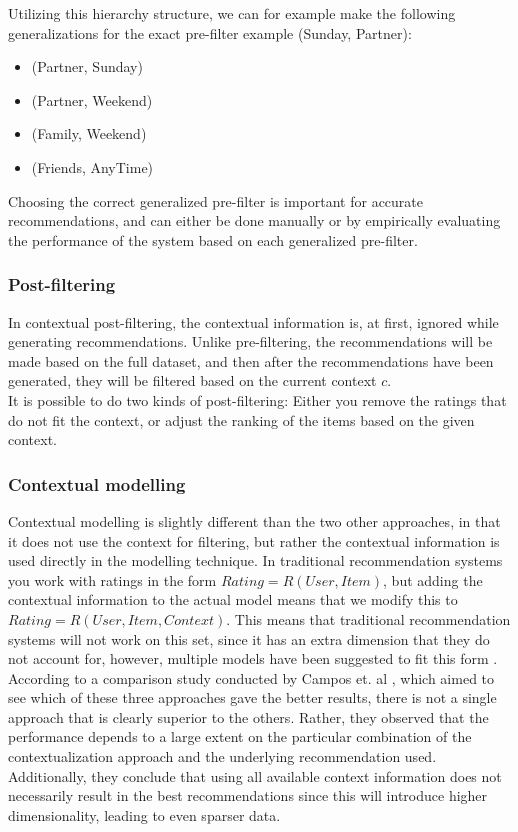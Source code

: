 Utilizing this hierarchy structure, we can for example make the following generalizations for the exact pre-filter example (Sunday, Partner):
\begin{itemize}
	\item (Partner, Sunday)
	\item (Partner, Weekend)
	\item (Family, Weekend)
	\item (Friends, AnyTime)
\end{itemize}

Choosing the correct generalized pre-filter is important for accurate recommendations, and can either be done manually or by empirically evaluating the performance of the system based on each generalized pre-filter.

\subsubsection*{Post-filtering}
In contextual post-filtering, the contextual information is, at first, ignored while generating recommendations.
Unlike pre-filtering, the recommendations will be made based on the full dataset, and then after the recommendations have been generated, they will be filtered based on the current context $c$.\\
It is possible to do two kinds of post-filtering: Either you remove the ratings that do not fit the context, or adjust the ranking of the items based on the given context.

\subsubsection*{Contextual modelling}
Contextual modelling is slightly different than the two other approaches, in that it does not use the context for filtering, but rather the contextual information is used directly in the modelling technique.
In traditional recommendation systems you work with ratings in the form $Rating = R(User, Item)$, but adding the contextual information to the actual model means that we modify this to $Rating = R(User, Item, Context)$.
This means that traditional recommendation systems will not work on this set, since it has an extra dimension that they do not account for, however, multiple models have been suggested to fit this form \cite{Adomavicius2011}.\\

According to a comparison study conducted by Campos et. al \cite{10.1007/978-3-642-39878-0_13}, which aimed to see which of these three approaches gave the better results, there is not a single approach that is clearly superior to the others.
Rather, they observed that the performance depends to a large extent on the particular combination of the contextualization approach and the underlying recommendation used.\\
Additionally, they conclude that using all available context information does not necessarily result in the best recommendations since this will introduce higher dimensionality, leading to even sparser data.
